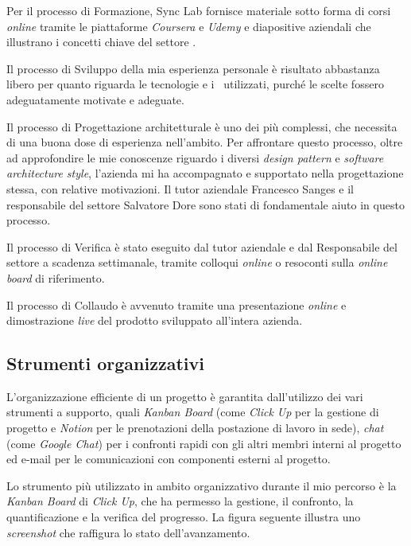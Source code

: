 Per il processo di Formazione, Sync Lab fornisce materiale sotto forma di corsi \textit{online} tramite le piattaforme \textit{Coursera} e \textit{Udemy} e diapositive aziendali che illustrano i concetti chiave del settore .

Il processo di Sviluppo della mia esperienza personale è risultato abbastanza libero per quanto riguarda le tecnologie e i \software\ utilizzati, purché le scelte fossero adeguatamente motivate e adeguate.

Il processo di Progettazione architetturale è uno dei più complessi, che necessita di una buona dose di esperienza nell'ambito.
Per affrontare questo processo, oltre ad approfondire le mie conoscenze riguardo i diversi \textit{design pattern} e \textit{software architecture style}, l'azienda mi ha accompagnato e supportato nella progettazione stessa, con relative motivazioni.
Il tutor aziendale  Francesco Sanges e il responsabile del settore  Salvatore Dore
sono stati di fondamentale aiuto in questo processo.

Il processo di Verifica è stato eseguito dal tutor aziendale e dal Responsabile del settore  a scadenza settimanale, tramite colloqui \textit{online} o resoconti sulla \textit{online board} di riferimento.

Il processo di Collaudo è avvenuto tramite una presentazione \textit{online} e dimostrazione \textit{live} del prodotto sviluppato all'intera azienda.

\subsection{Strumenti organizzativi}

L'organizzazione efficiente di un progetto è garantita dall'utilizzo dei vari strumenti a supporto, quali \textit{Kanban Board} (come \textit{Click Up} per la gestione di progetto e \textit{Notion} per le prenotazioni della postazione di lavoro in sede), \textit{chat} (come \textit{Google Chat}) per i confronti rapidi con gli altri membri interni al progetto ed e-mail per le comunicazioni con componenti esterni al progetto.

Lo strumento più utilizzato in ambito organizzativo durante il mio percorso è la \textit{Kanban Board} di \textit{Click Up}, che ha permesso la gestione, il confronto, la quantificazione e la verifica del progresso.
La figura seguente illustra uno \textit{screenshot} che raffigura lo stato dell'avanzamento.

